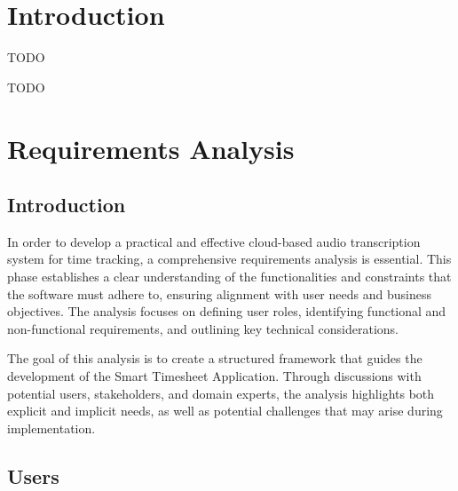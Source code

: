 \documentclass[
  digital,     %
  oneside,     %
  nosansbold,  %
  nocolorbold, %
  lof,         %
  lot,         %
]{fithesis4}
\begin{document}
\chapter*{Introduction}
TODO

\begin{otherlanguage}{czech}
TODO
\end{otherlanguage}

\chapter{Requirements Analysis}

\section{Introduction}

In order to develop a practical and effective cloud-based audio transcription system for time tracking, a comprehensive requirements analysis is essential. This phase establishes a clear understanding of the functionalities and constraints that the software must adhere to, ensuring alignment with user needs and business objectives. The analysis focuses on defining user roles, identifying functional and non-functional requirements, and outlining key technical considerations.

The goal of this analysis is to create a structured framework that guides the development of the Smart Timesheet Application. Through discussions with potential users, stakeholders, and domain experts, the analysis highlights both explicit and implicit needs, as well as potential challenges that may arise during implementation.

\section{Users}
\end{document}
